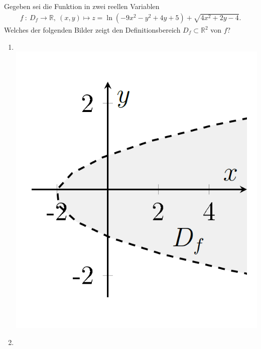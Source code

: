 \subsection*{}
Gegeben sei die Funktion in zwei reellen Variablen
\begin{align*}
f \ : \ D_f \to \mathbb{R}, \
(x,y) \mapsto z = 
\ln(-9 x^2 -y^2 + 4 y +5) + \sqrt{4x^2 + 2y - 4 }.
\end{align*}
Welches der folgenden Bilder zeigt den Definitionsbereich $D_f \subset \mathbb{R}^2$ von $f$?
\renewcommand{\labelenumi}{(\alph{enumi})}
\begin{enumerate}
\item \text{} \\
\includegraphics[scale=0.3]{pictures/BildA}
\item \text{} \\

\end{enumerate}
